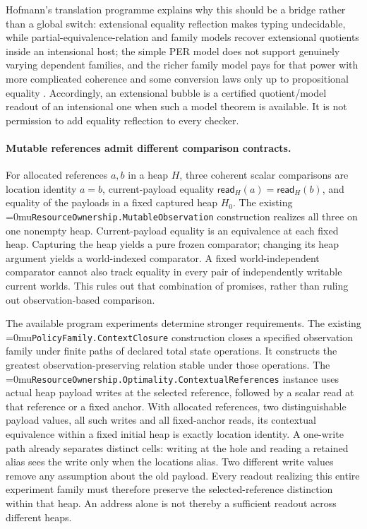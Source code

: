 \documentclass[11pt]{article}
\newcommand{\leanname}[1]{\textup{\Urlmuskip=0mu\relax\nolinkurl{#1}}}
\theoremstyle{definition}
\theoremstyle{remark}
\begin{document}
Hofmann's translation programme explains why this should be a bridge rather
than a global switch: extensional equality reflection makes typing
undecidable, while partial-equivalence-relation and family models recover
extensional quotients inside an intensional host; the simple PER model does not
support genuinely varying dependent families, and the richer family model pays
for that power with more complicated coherence and some conversion laws only
up to propositional equality \cite{HofmannExtensionalConcepts}.  Accordingly,
an extensional bubble is a certified quotient/model readout of an intensional
one when such a model theorem is available.  It is not permission to add
equality reflection to every checker.

\paragraph{Mutable references admit different comparison contracts.}
For allocated references $a,b$ in a heap $H$, three coherent scalar
comparisons are location identity $a=b$, current-payload equality
$\mathsf{read}_H(a)=\mathsf{read}_H(b)$, and equality of the payloads in a
fixed captured heap $H_0$. The existing
\leanname{ResourceOwnership.MutableObservation} construction realizes all
three on one nonempty heap. Current-payload equality is an equivalence at
each fixed heap. Capturing the heap yields a pure frozen comparator;
changing its heap argument yields a world-indexed comparator. A fixed
world-independent comparator cannot also track equality in every pair of
independently writable current worlds. This rules out that combination of
promises, rather than ruling out observation-based comparison.

The available program experiments determine stronger requirements. The
existing \leanname{PolicyFamily.ContextClosure} construction closes a
specified observation family under finite paths of declared total state
operations. It constructs the greatest observation-preserving relation
stable under those operations. The
\leanname{ResourceOwnership.Optimality.ContextualReferences} instance uses
actual heap payload writes at the selected reference, followed by a scalar
read at that reference or a fixed anchor. With allocated references, two
distinguishable payload values, all such writes and all fixed-anchor reads,
its contextual equivalence within a fixed initial heap is exactly location
identity. A one-write path already separates distinct cells: writing at the
hole and reading a retained alias sees the write only when the locations
alias. Two different write values remove any assumption about the old
payload. Every readout realizing this entire experiment family must
therefore preserve the selected-reference distinction within that heap.
An address alone is not thereby a sufficient readout across different heaps.
\end{document}
